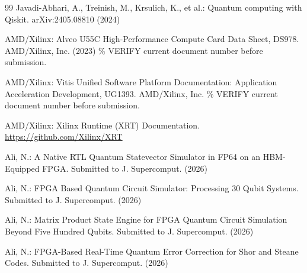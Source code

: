 \documentclass[pdflatex,sn-mathphys,Numbered]{sn-jnl}
\begin{document}
\begin{thebibliography}{99}
 Javadi-Abhari, A., Treinish, M., Krsulich, K., et al.: Quantum computing with Qiskit. arXiv:2405.08810 (2024)

 AMD/Xilinx: Alveo U55C High-Performance Compute Card Data Sheet, DS978. AMD/Xilinx, Inc. (2023) \% VERIFY current document number before submission.

 AMD/Xilinx: Vitis Unified Software Platform Documentation: Application Acceleration Development, UG1393. AMD/Xilinx, Inc. \% VERIFY current document number before submission.

 AMD/Xilinx: Xilinx Runtime (XRT) Documentation. \url{https://github.com/Xilinx/XRT}

 Ali, N.: A Native RTL Quantum Statevector Simulator in FP64 on an HBM-Equipped FPGA. Submitted to J. Supercomput. (2026)

 Ali, N.: FPGA Based Quantum Circuit Simulator: Processing 30 Qubit Systems. Submitted to J. Supercomput. (2026)

 Ali, N.: Matrix Product State Engine for FPGA Quantum Circuit Simulation Beyond Five Hundred Qubits. Submitted to J. Supercomput. (2026)

 Ali, N.: FPGA-Based Real-Time Quantum Error Correction for Shor and Steane Codes. Submitted to J. Supercomput. (2026)

\end{thebibliography}
\end{document}

